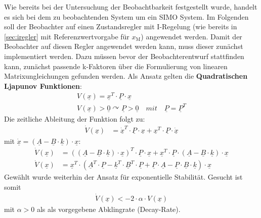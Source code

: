 Wie bereits bei der Untersuchung der Beobachtbarkeit festgestellt wurde, handelt es sich bei dem zu beobachtenden System um ein SIMO System. Im Folgenden soll der Beobachter auf einen Zustandsregler mit I-Regelung (wie bereits in \autoref{sec:iregler} mit Referenzwertvorgabe für $x_{\mathrm{M}}$) angewendet werden. Damit der Beobachter auf diesen Regler angewendet werden kann, muss dieser zunächst implementiert werden. Dazu müssen bevor der Beobachterentwurf stattfinden kann, zunächst passende k-Faktoren über die Formulierung von linearen Matrixungleichungen gefunden werden. Als Ansatz gelten die \textbf{Quadratischen Ljapunov Funktionen}:
\begin{align}
    V(\underline{x}) = \underline{x}^T \cdot \underline{P} \cdot \underline{x} \\
    V(\underline{x}) > \underline{0} \curvearrowright   \underline{P} > \underline{0} \quad mit \quad 
    \underline{P} = \underline{P}^T \nonumber
\end{align}
\newline
Die zeitliche Ableitung der Funktion folgt zu:
\begin{align}
    \dot{V}(\underline{x}) &= \dot{\underline{x}}^T \cdot \underline{P} \cdot \underline{x} + \underline{x}^T \cdot \underline{P} \cdot \dot{\underline{x}}
\end{align}
\newline
mit $\dot{\underline{x}} = (\underline{A}-\underline{B}\cdot\underline{k})\cdot\underline{x}$:
\begin{align}
    \dot{V}(\underline{x}) &= ((\underline{A}-\underline{B}\cdot\underline{k})\cdot\underline{x})^T \cdot \underline{P} \cdot \underline{x} + \underline{x}^T \cdot \underline{P} \cdot (\underline{A}-\underline{B}\cdot\underline{k})\cdot\underline{x} \nonumber \\
    \dot{V}(\underline{x}) &= \underline{x}^T\cdot(\underline{A}^T\cdot\underline{P}-\underline{k}^T\cdot\underline{B}^T\cdot\underline{P}+\underline{P}\cdot\underline{A}-\underline{P}\cdot\underline{B}\cdot\underline{k})\cdot\underline{x}
\end{align}
\newline
Gewählt wurde weiterhin der Ansatz für exponentielle Stabilität. Gesucht ist somit
\begin{align}
    \dot{V}(\underline{x}) < -2\cdot\alpha \cdot V(\underline{x})
\end{align}
\newline
mit $\alpha > 0$ als als vorgegebene Abklingrate (Decay-Rate).\\


